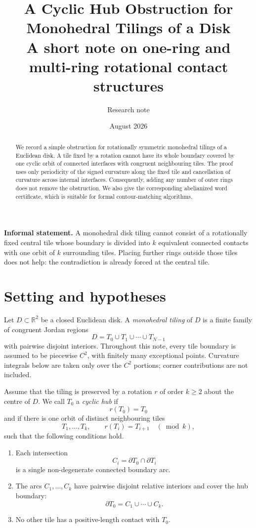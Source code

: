 \documentclass[11pt]{article}
\title{\textbf{A Cyclic Hub Obstruction for Monohedral Tilings of a Disk}\\[2mm]
\large A short note on one-ring and multi-ring rotational contact structures}
\author{Research note}
\date{August 2026}
\theoremstyle{definition}
\theoremstyle{remark}
\newcommand{\D}{D}
\newcommand{\T}{T}
\begin{document}
\maketitle

\begin{abstract}
We record a simple obstruction for rotationally symmetric monohedral tilings of a Euclidean disk.  A tile fixed by a rotation cannot have its whole boundary covered by one cyclic orbit of connected interfaces with congruent neighbouring tiles.  The proof uses only periodicity of the signed curvature along the fixed tile and cancellation of curvature across internal interfaces.  Consequently, adding any number of outer rings does not remove the obstruction.  We also give the corresponding abelianized word certificate, which is suitable for formal contour-matching algorithms.
\end{abstract}

\begin{plainbox}[boxblue]
\textbf{Informal statement.}
A monohedral disk tiling cannot consist of a rotationally fixed central tile whose boundary is divided into $k$ equivalent connected contacts with one orbit of $k$ surrounding tiles.  Placing further rings outside those tiles does not help: the contradiction is already forced at the central tile.
\end{plainbox}

\section{Setting and hypotheses}

Let $\D\subset\mathbb R^2$ be a closed Euclidean disk.  A \emph{monohedral tiling} of $\D$ is a finite family of congruent Jordan regions
\[
  \D=\T_0\cup\T_1\cup\cdots\cup\T_{N-1}
\]
with pairwise disjoint interiors.  Throughout this note, every tile boundary is assumed to be piecewise $C^2$, with finitely many exceptional points.  Curvature integrals below are taken only over the $C^2$ portions; corner contributions are not included.

Assume that the tiling is preserved by a rotation $r$ of order $k\ge 2$ about the centre of $\D$.  We call $\T_0$ a \emph{cyclic hub} if
\[
  r(\T_0)=\T_0
\]
and if there is one orbit of distinct neighbouring tiles
\[
  \T_1,\ldots,\T_k,\qquad r(\T_i)=\T_{i+1}\quad (\bmod k),
\]
such that the following conditions hold.

\begin{enumerate}[label=(H\arabic*),leftmargin=12mm]
\item Each intersection
\[
  C_i=\partial\T_0\cap\partial\T_i
\]
is a single non-degenerate connected boundary arc.
\item The arcs $C_1,\ldots,C_k$ have pairwise disjoint relative interiors and cover the hub boundary:
\[
  \partial\T_0=C_1\cup\cdots\cup C_k.
\]
\item No other tile has a positive-length contact with $\T_0$.
\end{enumerate}
\end{document}
